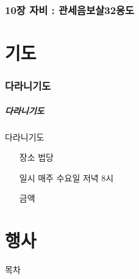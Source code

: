 \documentclass[aspectratio=1610,12pt,xcolor=pdftex,dvipsnames,table,handout]{beamer}
\begin{document}
%
	\section{	10장	자비	:	관세음보살32응도		}
	\frame [plain] {\sectionpage}



		\part{기도}
		\frame{\partpage}



%
		\section{다라니기도}
		\begin{frame} [t,plain]
		\frametitle{다라니기도}
			\begin{block} {다라니기도 }
			\setlength{\leftmargini}{5em}			
			\begin{itemize}
				\item [장소]	 법당
				\item [일시]	 매주 수요일 저녁 8시
				\item [금액]	
			\end{itemize}
			\end{block}						
		\end{frame}					






		\part{행사}
		\frame{\partpage}
		
		\begin{frame} [plain]{목차}
		\tableofcontents%
		\end{frame}
		
\end{document}

